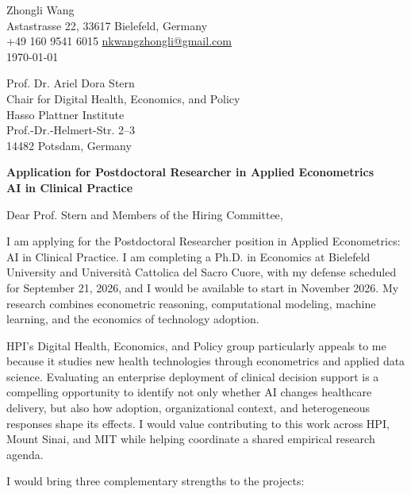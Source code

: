 \documentclass[11pt]{article}
\begin{document}
\begin{flushright}
Zhongli Wang \\
Astastrasse 22, 33617 Bielefeld, Germany \\
+49 160 9541 6015 \quad \href{mailto:nkwangzhongli@gmail.com}{nkwangzhongli@gmail.com} \\
\today
\end{flushright}

\vspace{-0.3cm}

\noindent
Prof. Dr. Ariel Dora Stern \\
Chair for Digital Health, Economics, and Policy \\
Hasso Plattner Institute \\
Prof.-Dr.-Helmert-Str. 2--3 \\
14482 Potsdam, Germany

\vspace{0.2cm}

\noindent
\textbf{Application for Postdoctoral Researcher in Applied Econometrics} \\
\textbf{AI in Clinical Practice}

\vspace{0.15cm}

\noindent Dear Prof. Stern and Members of the Hiring Committee,

I am applying for the Postdoctoral Researcher position in Applied Econometrics: AI in Clinical Practice. I am completing a Ph.D. in Economics at Bielefeld University and Universit\`a Cattolica del Sacro Cuore, with my defense scheduled for September 21, 2026, and I would be available to start in November 2026. My research combines econometric reasoning, computational modeling, machine learning, and the economics of technology adoption.

HPI's Digital Health, Economics, and Policy group particularly appeals to me because it studies new health technologies through econometrics and applied data science. Evaluating an enterprise deployment of clinical decision support is a compelling opportunity to identify not only whether AI changes healthcare delivery, but also how adoption, organizational context, and heterogeneous responses shape its effects. I would value contributing to this work across HPI, Mount Sinai, and MIT while helping coordinate a shared empirical research agenda.

I would bring three complementary strengths to the projects:
\end{document}
